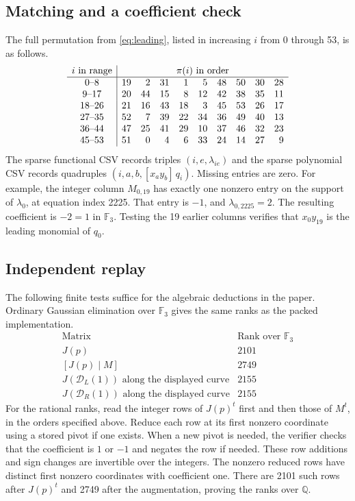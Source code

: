 \documentclass[11pt]{amsart}
\newcommand{\F}{\mathbb F}
\newcommand{\Q}{\mathbb Q}
\begin{document}
\subsection{Matching and a coefficient check}
The full permutation from \eqref{eq:leading}, listed in increasing
$i$ from 0 through 53, is as follows.
\[
\begin{array}{c|rrrrrrrrr}
i\text{ in range} & \multicolumn{9}{c}{\pi(i)\text{ in order}}\\ \hline
 0\text{--}8   &19&2&31&1&5&48&50&30&28\\
 9\text{--}17  &20&44&15&8&12&42&38&35&11\\
18\text{--}26  &21&16&43&18&3&45&53&26&17\\
27\text{--}35  &52&7&39&22&34&36&49&40&13\\
36\text{--}44  &47&25&41&29&10&37&46&32&23\\
45\text{--}53  &51&0&4&6&33&24&14&27&9
\end{array}
\]
The sparse functional CSV records triples $(i,e,\lambda_{ie})$
and the sparse polynomial CSV records quadruples
$(i,a,b,[x_a y_b]\,q_i)$. Missing entries are zero. For example,
the integer column $M_{0,19}$ has exactly one nonzero entry on
the support of $\lambda_0$, at equation index 2225. That entry
is $-1$, and $\lambda_{0,2225}=2$. The resulting coefficient is
$-2=1$ in $\F_3$. Testing the 19 earlier columns verifies that
$x_0y_{19}$ is the leading monomial of $q_0$.

\subsection{Independent replay}
The following finite tests suffice for the algebraic deductions in
the paper. Ordinary Gaussian elimination over $\F_3$ gives the
same ranks as the packed implementation.
\[
\begin{array}{c|r}
 \text{Matrix} & \text{Rank over }\F_3\\ \hline
 J(p)                   & 2101\\
 \left[J(p)\mid M\right] & 2749\\
 J(\mathcal D_L(1))\text{ along the displayed curve} & 2155\\
 J(\mathcal D_R(1))\text{ along the displayed curve} & 2155
\end{array}
\]
For the rational ranks, read the integer rows of $J(p)^t$ first
and then those of $M^t$, in the orders specified above. Reduce
each row at its first nonzero coordinate using a stored pivot if
one exists. When a new pivot is needed, the verifier checks that
the coefficient is $1$ or $-1$ and negates the row if needed.
These row additions and sign changes are invertible over the
integers. The nonzero reduced rows have distinct first nonzero
coordinates with coefficient one. There are 2101 such rows after
$J(p)^t$ and 2749 after the augmentation, proving the ranks
over $\Q$.
\end{document}
